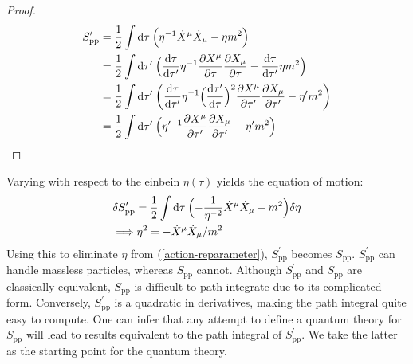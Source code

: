\begin{tcolorbox}[breakable]
	\begin{proof}
		\begin{align*}
			S^\prime _{\mathrm{pp}}&=\frac{1}{2}\int \mathrm{d}\tau\: \Bigl(\eta^{-1}\dot{X}^\mu \dot{X}_\mu-\eta m^2\Bigr) \nonumber \\
			&=\frac{1}{2}\int \mathrm{d}\tau^\prime \:\Bigl(\frac{\mathrm{d}\tau}{\mathrm{d}\tau^\prime} \eta^{-1}\frac{\partial X^\mu}{\partial \tau} \frac{\partial X_\mu}{\partial \tau}-\frac{\mathrm{d}\tau}{\mathrm{d}\tau^\prime} \eta m^2\Bigr) \nonumber \\
			&=\frac{1}{2}\int \mathrm{d}\tau^\prime\: \biggl(\frac{\mathrm{d}\tau}{\mathrm{d}\tau^\prime} \eta^{-1}\Bigl(\frac{\mathrm{d}\tau^\prime}{\mathrm{d}\tau}\Bigr)^2\frac{\partial X^\mu}{\partial \tau^\prime} \frac{\partial X_\mu}{\partial \tau^\prime}- \eta^\prime m^2\biggr) \nonumber \\
			&=\frac{1}{2}\int \mathrm{d}\tau^\prime\: \Bigl(\eta^{\prime -1}\frac{\partial X^\mu}{\partial \tau^\prime} \frac{\partial X_\mu}{\partial \tau^\prime}- \eta^\prime m^2\Bigr) \nonumber
		\end{align*}
	\end{proof}
\end{tcolorbox} 

Varying with respect to the einbein $\eta(\tau)$ yields the equation of motion: 
\begin{align}
	&\delta S_{\mathrm{pp}}^\prime =\frac{1}{2}\int \mathrm{d}\tau\:\Bigl(-\frac{1}{\eta^{-2}}\dot{X}^\mu\dot{X}_\mu-m^2\Bigr)\delta\eta \nonumber \\
	&\Longrightarrow \eta^2=-\dot{X}^\mu\dot{X}_\mu/m^2 \label{1.2.7}
\end{align}
Using this to eliminate $\eta$ from (\ref{action-reparameter}), $S_{\mathrm{pp}}^\prime$ becomes $S_{\mathrm{pp}}$. 
$S_{\mathrm{pp}}^\prime$ can handle massless particles, whereas $S_{\mathrm{pp}}$ cannot. 
Although $S_{\mathrm{pp}}^\prime$ and $S_{\mathrm{pp}}$ are classically equivalent, $S_{\mathrm{pp}}$ is difficult to path-integrate due to its complicated form. Conversely, $S_{\mathrm{pp}}^\prime$ is a quadratic in derivatives, making the path integral quite easy to compute. One can infer that any attempt to define a quantum theory for $S_{\mathrm{pp}}$ will lead to results equivalent to the path integral of $S_{\mathrm{pp}}^\prime$. We take the latter as the starting point for the quantum theory. 

